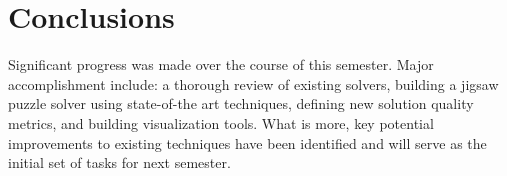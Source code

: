 \documentclass{report}
\begin{document}
\pagebreak
\section{Conclusions}\label{sec:conclusions}

Significant progress was made over the course of this semester.  Major accomplishment include: a thorough review of existing solvers, building a jigsaw puzzle solver using state-of-the art techniques, defining new solution quality metrics, and building visualization tools.  What is more, key potential improvements to existing techniques have been identified and will serve as the initial set of tasks for next semester.











\pagebreak


\end{document}

